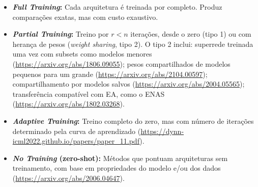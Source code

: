 \documentclass[a4paper,12pt]{article}
\begin{document}
\begin{appendices}
\begin{itemize}[noitemsep]
    \item \textbf{\textit{Full Training}:} Cada arquitetura é treinada por completo. Produz comparações exatas, mas com custo exaustivo.

    \item \textbf{\textit{Partial Training}:} Treino por $r < n$ iterações, desde o zero (tipo 1) ou com herança de pesos (\textit{weight sharing}, tipo 2). O tipo 2 inclui: superrede treinada uma vez com subsets como modelos menores (\url{https://arxiv.org/abs/1806.09055}); pesos compartilhados de modelos pequenos para um grande (\url{https://arxiv.org/abs/2104.00597}); compartilhamento por modelos salvos (\url{https://arxiv.org/abs/2004.05565}); transferência compatível com EA, como o ENAS (\url{https://arxiv.org/abs/1802.03268}).

    \item \textbf{\textit{Adaptive Training}:} Treino completo do zero, mas com número de iterações determinado pela curva de aprendizado (\url{https://dynn-icml2022.github.io/papers/paper_11.pdf}).

    \item \textbf{\textit{No Training} (zero-shot):} Métodos que pontuam arquiteturas sem treinamento, com base em propriedades do modelo e/ou dos dados (\url{https://arxiv.org/abs/2006.04647}).
\end{itemize}

\end{appendices}
\end{document}
